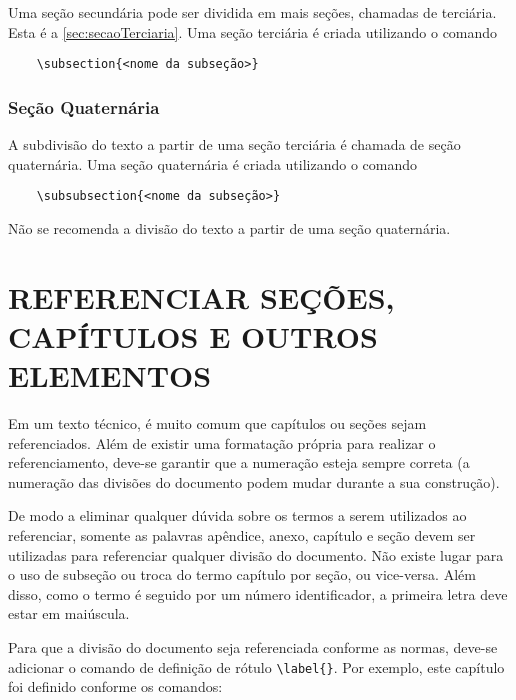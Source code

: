  Uma seção secundária pode ser dividida em mais seções, chamadas de terciária. Esta é a \autoref{sec:secaoTerciaria}. Uma seção terciária é criada utilizando o comando 

\begin{verbatim}
    \subsection{<nome da subseção>} 
\end{verbatim}

\subsubsection{Seção Quaternária}
\label{sec:secaoQuaternaria}

A subdivisão do texto a partir de uma seção terciária é chamada de seção quaternária. Uma seção quaternária é criada utilizando o comando 

\begin{verbatim}
    \subsubsection{<nome da subseção>} 
\end{verbatim}

Não se recomenda a divisão do texto a partir de uma seção quaternária. 

\section{REFERENCIAR SEÇÕES, CAPÍTULOS E OUTROS ELEMENTOS}

Em um texto técnico, é muito comum que capítulos ou seções sejam referenciados. Além de existir uma formatação própria para realizar o referenciamento, deve-se garantir que a numeração esteja sempre correta (a numeração das divisões do documento podem mudar durante a sua construção). 

De modo a eliminar qualquer dúvida sobre os termos a serem utilizados ao referenciar, somente as palavras apêndice, anexo, capítulo e seção devem ser utilizadas para referenciar qualquer divisão do documento. Não existe lugar para o uso de subseção ou troca do termo capítulo por seção, ou vice-versa. Além disso, como o termo é seguido por um número identificador, a primeira letra deve estar em maiúscula. 

Para que a divisão do documento seja referenciada conforme as normas, deve-se adicionar o comando de definição de rótulo \verb!\label{}!. Por exemplo, este capítulo foi definido conforme os comandos:

